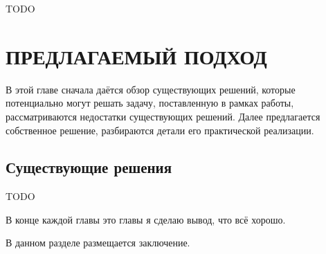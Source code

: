 \documentclass[times]{itmo-student-thesis}
\begin{document}
\chapterconclusion

TODO

\chapter{ПРЕДЛАГАЕМЫЙ ПОДХОД}

В этой главе сначала даётся обзор существующих решений, которые потенциально могут решать задачу, поставленную в рамках 
работы, рассматриваются недостатки существующих решений. Далее предлагается собственное решение, разбираются детали его
практической реализации.   

\section{Существующие решения}\label{sec:existing_solutions}

TODO

\chapterconclusion

В конце каждой главы это главы я сделаю вывод, что всё хорошо.

\startconclusionpage

В данном разделе размещается заключение.

\printmainbibliography
\end{document}
